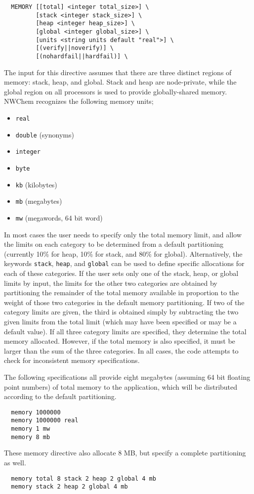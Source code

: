\begin{verbatim}
  MEMORY [[total] <integer total_size>] \
         [stack <integer stack_size>] \
         [heap <integer heap_size>] \
         [global <integer global_size>] \
         [units <string units default "real">] \
         [(verify||noverify)] \
         [(nohardfail||hardfail)] \
\end{verbatim}

The input for
this directive assumes that there are three distinct regions of
memory: stack, heap, and global.  Stack and heap are node-private,
while the global region on all processors is used to provide
globally-shared memory.  NWChem
recognizes the following memory units;

\begin{itemize}
\item \verb+real+
\item \verb+double+ (synonyms)
\item \verb+integer+
\item \verb+byte+
\item \verb+kb+ (kilobytes)
\item \verb+mb+ (megabytes)
\item \verb+mw+ (megawords, 64 bit word)
\end{itemize}

In most cases the user needs to specify only the total memory limit, and
allow the limits on each category to be determined from a default
partitioning (currently 10\% for heap, 10\% for stack, and 80\% for
global).  Alternatively, the keywords \verb+stack+, \verb+heap+, and
\verb+global+ can be used to define specific allocations for each of
these categories.  If the user sets only one of the stack, heap, or global
limits by input, the limits for the other two categories are obtained
by partitioning the remainder of the total memory available in proportion 
to the weight of those two categories in the default memory
partitioning.  If two of the category limits are given, the third is
obtained simply by subtracting the two given limits from the total limit
(which may have been specified or may be a default value).  If all three
category limits are specified, they determine the total memory allocated.
However,  if the
total memory is also specified, it must be larger than the sum of the
three categories.  In all cases, the code
attempts to check for inconsistent memory specifications.

The following specifications all provide eight megabytes (assuming 64
bit floating point numbers) of total memory to the application, which
will be distributed according to the default partitioning.
\begin{verbatim}
  memory 1000000
  memory 1000000 real
  memory 1 mw
  memory 8 mb
\end{verbatim}
These memory directive also allocate 8 MB, but specify a complete
partitioning as well.
\begin{verbatim}
  memory total 8 stack 2 heap 2 global 4 mb
  memory stack 2 heap 2 global 4 mb
\end{verbatim}

